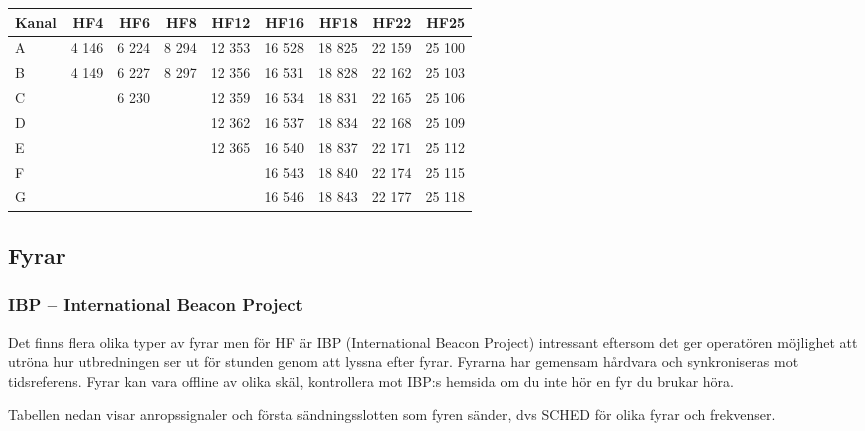 \begin{longtable}{lrrrrrrrr}
\textbf{Kanal} & \textbf{HF4} & \textbf{HF6} & \textbf{HF8} & \textbf{HF12} & \textbf{HF16} & \textbf{HF18} & \textbf{HF22} & \textbf{HF25} \\
\hline
\endhead

A & 4 146 & 6 224 & 8 294 & 12 353 & 16 528 & 18 825 & 22 159 & 25 100 \\
B & 4 149 & 6 227 & 8 297 & 12 356 & 16 531 & 18 828 & 22 162 & 25 103 \\
C &       & 6 230 &       & 12 359 & 16 534 & 18 831 & 22 165 & 25 106 \\
D &       &       &       & 12 362 & 16 537 & 18 834 & 22 168 & 25 109 \\
E &       &       &       & 12 365 & 16 540 & 18 837 & 22 171 & 25 112 \\
F &       &       &       &        & 16 543 & 18 840 & 22 174 & 25 115 \\
G &       &       &       &        & 16 546 & 18 843 & 22 177 & 25 118 \\
\end{longtable}

\clearpage
\subsection{Fyrar}

\subsubsection{IBP -- International Beacon Project}

Det finns flera olika typer av fyrar men för HF är IBP (International Beacon Project) intressant eftersom det ger operatören möjlighet att utröna hur utbredningen ser ut för stunden genom att lyssna efter fyrar. Fyrarna har gemensam hårdvara och synkroniseras mot tidsreferens. Fyrar kan vara offline av olika skäl, kontrollera mot IBP:s hemsida om du inte hör en fyr du brukar höra.

Tabellen nedan visar anropssignaler och första sändningsslotten som fyren sänder, dvs SCHED för olika fyrar och frekvenser.

